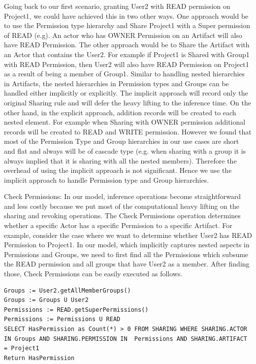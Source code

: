 \documentclass[sigconf]{acmart}
\begin{document}
Going back to our first scenario, granting User2 with READ permission on Project1, we could have achieved this in two other ways. One approach would be to use the Permission type hierarchy and Share Project1 with a Super permission of READ (e.g). An actor who has OWNER Permission on an Artifact will also have READ Permission. The other approach would be to Share the Artifact with an Actor that contains the User2. For example if Project1 is Shared with Group1 with READ Permission, then User2 will also have READ Permission on Project1 as a result of being a member of Group1. Similar to handling nested hierarchies in Artifacts, the nested hierarchies in Permission types and Groups can be handled either implicitly or explicitly. The implicit approach will record only the original Sharing rule and will defer the heavy lifting to the inference time. On the other hand, in the explicit approach, addition records will be created to each nested element. For example when Sharing with OWNER permission additional records will be created to READ and WRITE permission. However we found that most of the Permission Type and Group hierarchies in our use cases are short and flat and always will be of cascade type (e.g. when sharing with a group it is always implied that it is sharing with all the nested members). Therefore the overhead of using the implicit approach is not significant. Hence we use the implicit approach to handle Permission type and Group hierarchies.

Check Permissions: In our model, inference operations become straightforward and less costly because we put most of the computational heavy lifting on the sharing and revoking operations. The Check Permissions operation determines whether a specific Actor has a specific Permission to a specific Artifact. For example, consider the case where we want to determine whether User2 has READ Permission to Project1. In our model, which implicitly captures nested aspects in Permissions and Groups, we need to first find all the Permissions which subsume the READ permission and all groups that have User2 as a member. After finding those, Check Permissions can be easily executed as follows.

\begin{lstlisting}
Groups := User2.getAllMemberGroups()
Groups := Groups U User2
Permissions := READ.getSuperPermissions()
Permissions := Permissions U READ
SELECT HasPermission as Count(*) > 0 FROM SHARING WHERE SHARING.ACTOR IN Groups AND SHARING.PERMISSION IN  Permissions AND SHARING.ARTIFACT = Project1
Return HasPermission
\end{lstlisting}
\end{document}
